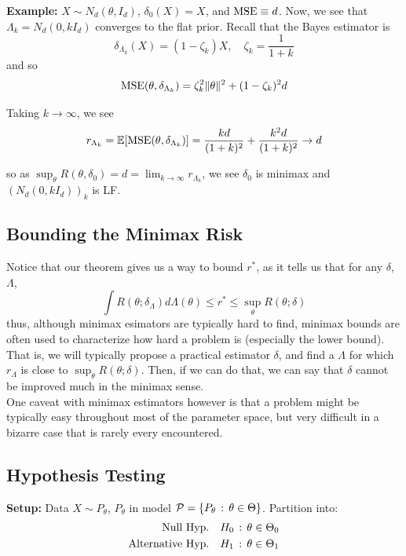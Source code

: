 \textbf{Example:} $X \sim N_d(\theta, I_d)$, $\delta_0(X) = X$, and $\tt{MSE} \equiv d$. Now, we see that $\Lambda_k = N_d(0, kI_d)$ converges to the flat prior. Recall that the Bayes estimator is
\[ \delta_{\Lambda_k}(X) = (1 - \zeta_k)X, \quad \zeta_k = \frac{1}{1 + k} \]
and so
\[ \tt{MSE}(\theta, \delta_{\Lambda_k}) = \zeta_k^2\norm{\theta}^2 + (1 - \zeta_k)^2 d \]

Taking $k \to \infty$, we see
\[ r_{\Lambda_k} = \E[\tt{MSE}(\theta, \delta_{\Lambda_k})] = \frac{kd}{(1 + k)^2} + \frac{k^2 d}{(1 + k)^2} \to d \]

so as $\sup_{\theta} R(\theta, \delta_0) = d = \lim_{k \to \infty} r_{\Lambda_k}$, we see $\delta_0$ is minimax and $(N_d(0, kI_d))_k$ is LF.\\

\subsection*{Bounding the Minimax Risk}

Notice that our theorem gives us a way to bound $r^{*}$, as it tells us that for any $\delta$, $\Lambda$, 
\[ \int R(\theta; \delta_{\Lambda}) d\Lambda(\theta) \leq r^{*} \leq \sup_{\theta} R(\theta; \delta) \]
thus, although minimax esimators are typically hard to find, minimax bounds are often used to characterize how hard a problem is (especially the lower bound).\\

That is, we will typically propose a practical estimator $\delta$, and find a $\Lambda$ for which $r_{\Lambda}$ is close to $\sup_{\theta} R(\theta; \delta)$. Then, if we can do that, we can say that $\delta$ cannot be improved much in the minimax sense.\\

One caveat with minimax estimators however is that a problem might be typically easy throughout most of the parameter space, but very difficult in a bizarre case that is rarely every encountered.

\subsection*{Hypothesis Testing}
\sectionspace

\textbf{Setup:} Data $X \sim P_{\theta}$, $P_{\theta}$ in model $\cal{P} = \{P_{\theta} \col \theta \in \Theta\}$. Partition into:
\begin{align*}
    \tt{Null Hyp.} &\quad H_0 \col \theta \in \Theta_0\\
    \tt{Alternative Hyp.} &\quad H_1 \col \theta \in \Theta_1
\end{align*}


